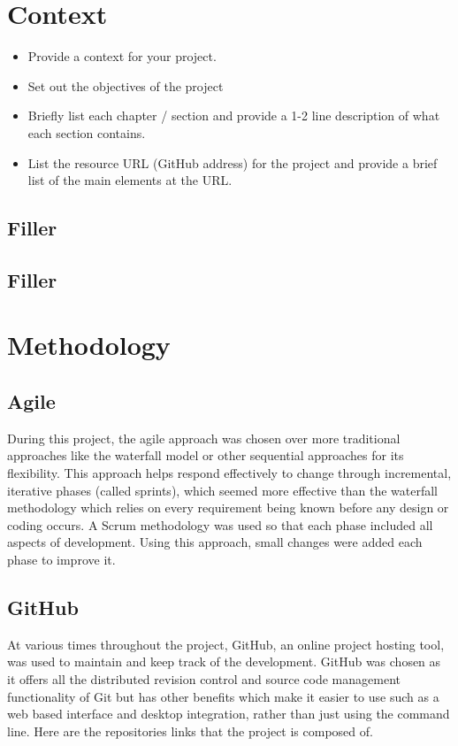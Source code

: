 \chapter{Context}
\begin{itemize}
\item Provide a context for your project.
\item Set out the objectives of the project
\item Briefly list each chapter / section and provide a 1-2 line description of what each section contains.
\item List the resource URL (GitHub address) for the project and provide a brief list of the main elements at the URL.
\end{itemize}

\section{Filler}


\section{Filler}


\chapter{Methodology}


\section{Agile}

During this project, the agile approach was chosen over more traditional approaches like the waterfall model or other sequential approaches for its flexibility. This approach helps respond effectively to change through incremental, iterative phases (called sprints), which seemed more effective than the waterfall methodology which relies on every requirement being known before any design or coding occurs. A Scrum methodology was used so that each phase included all aspects of development. Using this approach, small changes were added each phase to improve it.

\section{GitHub}

At various times throughout the project, GitHub, an online project hosting tool, was used to maintain and keep track of the development. GitHub was chosen as it offers all the distributed revision control and source code management functionality of Git but has other benefits which make it easier to use such as a web based interface and desktop integration, rather than just using the command line. Here are the repositories links that the project is composed of. 

